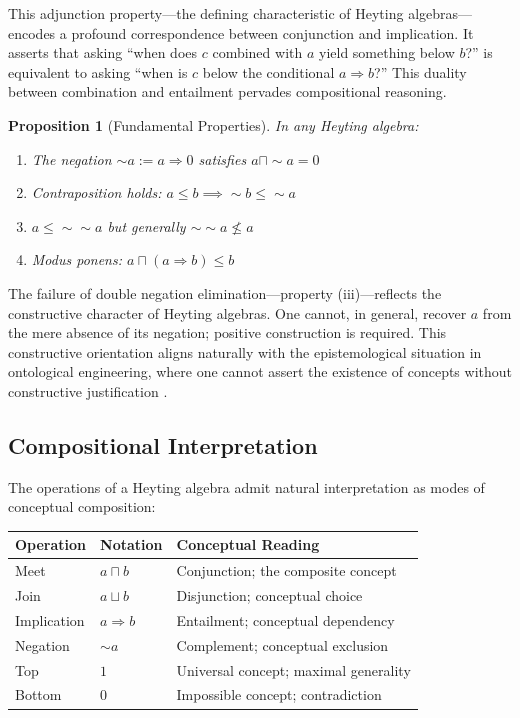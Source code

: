 \documentclass[12pt,a4paper]{article}
\newtheorem{proposition}[definition]{Proposition}
\begin{document}
This adjunction property---the defining characteristic of Heyting algebras---encodes a profound correspondence between conjunction and implication. It asserts that asking ``when does $c$ combined with $a$ yield something below $b$?'' is equivalent to asking ``when is $c$ below the conditional $a \Rightarrow b$?'' This duality between combination and entailment pervades compositional reasoning.

\begin{proposition}[Fundamental Properties]
In any Heyting algebra:
\begin{enumerate}[label=(\roman*)]
    \item The negation $\sim a := a \Rightarrow 0$ satisfies $a \sqcap \sim a = 0$
    \item Contraposition holds: $a \leq b \implies \sim b \leq \sim a$
    \item $a \leq \sim\sim a$ but generally $\sim\sim a \not\leq a$
    \item Modus ponens: $a \sqcap (a \Rightarrow b) \leq b$
\end{enumerate}
\end{proposition}

The failure of double negation elimination---property (iii)---reflects the constructive character of Heyting algebras. One cannot, in general, recover $a$ from the mere absence of its negation; positive construction is required. This constructive orientation aligns naturally with the epistemological situation in ontological engineering, where one cannot assert the existence of concepts without constructive justification \citep[cf.][]{sorensen2006}.

\subsection{Compositional Interpretation}

The operations of a Heyting algebra admit natural interpretation as modes of conceptual composition:

\begin{center}
\renewcommand{\arraystretch}{1.3}
\begin{tabular}{lll}
\textbf{Operation} & \textbf{Notation} & \textbf{Conceptual Reading}\\
\hline
Meet & $a \sqcap b$ & Conjunction; the composite concept\\
Join & $a \sqcup b$ & Disjunction; conceptual choice\\
Implication & $a \Rightarrow b$ & Entailment; conceptual dependency\\
Negation & $\sim a$ & Complement; conceptual exclusion\\
Top & $1$ & Universal concept; maximal generality\\
Bottom & $0$ & Impossible concept; contradiction
\end{tabular}
\end{center}
\end{document}
